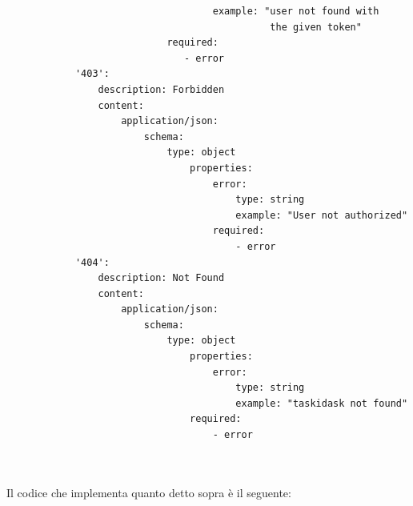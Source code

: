 \documentclass{report}
\begin{document}
\begin{verbatim}
                                    example: "user not found with
                                              the given token"
                            required:
                               - error
            '403':
                description: Forbidden
                content:
                    application/json:
                        schema:
                            type: object
                                properties:
                                    error:
                                        type: string
                                        example: "User not authorized"
                                    required:
                                        - error
            '404':
                description: Not Found
                content:
                    application/json:
                        schema:
                            type: object
                                properties:
                                    error:
                                        type: string
                                        example: "taskidask not found"
                                required:
                                    - error
	
	
\end{verbatim}

Il codice che implementa quanto detto sopra è il seguente:
\end{document}
